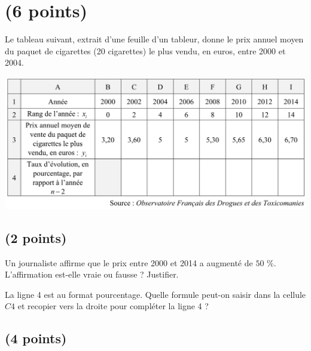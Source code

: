 \section{(6 points)}

Le tableau suivant, extrait d'une feuille d'un tableur, donne le prix annuel moyen du paquet de cigarettes (20 cigarettes) le plus vendu, en euros, entre 2000 et 2004.

\begin{center}
	\includegraphics[scale=0.4]{img/tabac}
\end{center}

\subsection{(2 points)}

\begin{questions}
	\question[1] Un journaliste affirme que le prix entre 2000 et 2014 a augmenté de $50$ \%. L'affirmation est-elle vraie ou fausse ? Justifier.
	
	\question[1] La ligne 4 est au format pourcentage. Quelle formule peut-on saisir dans la cellule $C4$ et recopier vers la droite pour compléter la ligne 4 ?
\end{questions}

\subsection{(4 points)}

